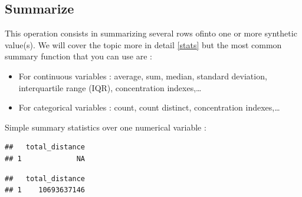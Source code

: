 \documentclass[
]{book}
\newenvironment{Shaded}{\begin{snugshade}}{\end{snugshade}}
\newcommand{\CommentTok}[1]{\textcolor[rgb]{0.56,0.35,0.01}{\textit{#1}}}
\newcommand{\DataTypeTok}[1]{\textcolor[rgb]{0.13,0.29,0.53}{#1}}
\newcommand{\KeywordTok}[1]{\textcolor[rgb]{0.13,0.29,0.53}{\textbf{#1}}}
\newcommand{\NormalTok}[1]{#1}
\newcommand{\OperatorTok}[1]{\textcolor[rgb]{0.81,0.36,0.00}{\textbf{#1}}}
\newcommand{\StringTok}[1]{\textcolor[rgb]{0.31,0.60,0.02}{#1}}
\providecommand{\tightlist}{%
  \setlength{\itemsep}{0pt}\setlength{\parskip}{0pt}}
\begin{document}
\hypertarget{summarize}{%
\subsection{Summarize}\label{summarize}}

This operation consists in summarizing several rows ofinto one or more synthetic value(s). We will cover the topic more in detail \ref{stats} but the most common summary function that you can use are :

\begin{itemize}
\tightlist
\item
  For continuous variables : average, sum, median, standard deviation, interquartile range (IQR), concentration indexes,\ldots{}
\item
  For categorical variables : count, count distinct, concentration indexes,\ldots{}
\end{itemize}

Simple summary statistics over one numerical variable :

\begin{Shaded}
\end{Shaded}

\begin{verbatim}
##   total_distance
## 1             NA
\end{verbatim}

\begin{Shaded}
\end{Shaded}

\begin{verbatim}
##   total_distance
## 1    10693637146
\end{verbatim}

\begin{Shaded}
\end{Shaded}
\end{document}
